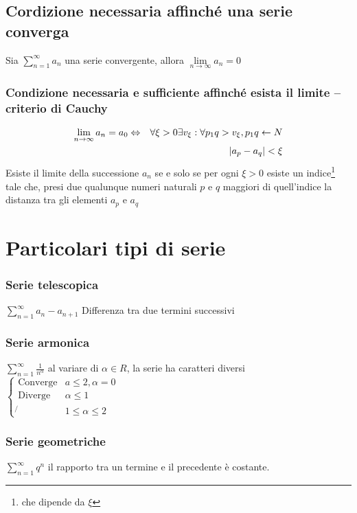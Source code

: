 \subsection{Cordizione necessaria affinché una serie converga}
Sia $\displaystyle\sum_{n=1}^{\infty}a_n$ una serie convergente, allora
$\lim\limits_{n\to\infty}a_n=0$
\subsubsection{Condizione necessaria e sufficiente affinché esista il limite --
criterio di Cauchy}
\begin{eqnarray*}
	\lim_{n\to \infty} a_n=a_0 &\Leftrightarrow & \forall \xi >0 \exists v_\xi
	: \forall p_1q>v_\xi, p_1q\leftarrow N \\
	&& \lvert a_p-a_q\rvert<\xi
\end{eqnarray*}
Esiste il limite della successione $a_n$ se e solo se per ogni $\xi >0$ esiste
un indice\footnote{che dipende da $\xi$} tale che, presi due qualunque numeri
naturali $p$ e $q$ maggiori di quell'indice la distanza tra gli elementi $a_p$
e $a_q$
\section{Particolari tipi di serie}
\subsubsection{Serie telescopica}
$\displaystyle\sum_{n=1}^{\infty}a_n-a_{n+1}$ Differenza tra due termini
successivi
\subsubsection{Serie armonica}
$\displaystyle\sum_{n=1}^{\infty}\frac{1}{n^\alpha}$ al variare di 
$\alpha \in R$, la serie ha caratteri diversi $\begin{cases}
	\text{Converge} & a\leq 2, \alpha=0\\
	\text{Diverge} &\alpha \leq 1\\
	\not{} &1\leq \alpha \leq 2
\end{cases}$
\subsubsection{Serie geometriche}
$\displaystyle\sum_{n=1}^{\infty}q^n$ il rapporto tra un termine e il
precedente è costante.

